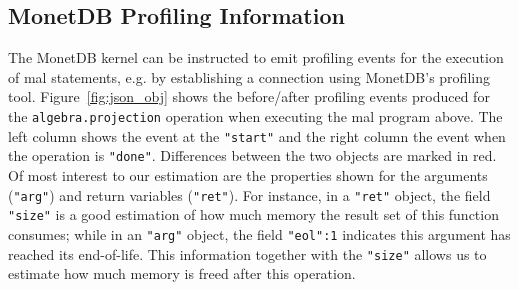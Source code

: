 \documentclass[conference]{IEEEtran}
\begin{document}
\subsection{MonetDB Profiling Information}

The MonetDB kernel can be instructed to emit profiling events for the execution of {\sc mal} statements, e.g. by establishing a connection using MonetDB’s profiling tool.
Figure~\ref{fig:json_obj} shows the before/after profiling events produced for the \texttt{\small algebra.projection} operation when executing the {\sc mal} program above.
The left column shows the event at the \texttt{\small "start"} and the right column the event when the operation is \texttt{\small "done"}.
Differences between the two objects are marked in red.
Of most interest to our estimation are the properties shown for the arguments (\texttt{\small "arg"}) and return variables (\texttt{\small "ret"}).
For instance, in a \texttt{\small "ret"} object, the field \texttt{\small "size"} is a good estimation of how much memory the result set of this function consumes; while in an \texttt{\small "arg"} object, the field \texttt{\small "eol":1} indicates this argument has reached its end-of-life.
This information together with the \texttt{\small "size"} allows us to estimate how much memory is freed after this operation.

\end{document}
